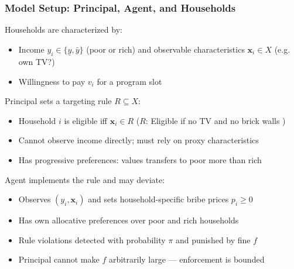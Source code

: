 \documentclass[aspectratio=169]{beamer}
\begin{document}
\begin{frame}
\frametitle{Model Setup: Principal, Agent, and Households}

Households are characterized by:
\begin{itemize}\setlength\itemsep{3pt}
    \item Income $y_i \in \{\underline{y}, \bar{y}\}$ (poor or rich) and observable characteristics $\mathbf{x}_i \in X$ (e.g. own TV?)
    \item Willingness to pay $v_i$ for a program slot
\end{itemize}\medskip

Principal sets a targeting rule $R \subseteq X$:
\begin{itemize}\setlength\itemsep{3pt}
    \item Household $i$ is eligible iff $\mathbf{x}_i \in R$ ($R$: Eligible if no TV and no brick walls  )
    \item Cannot observe income directly; must rely on proxy characteristics
    \item Has progressive preferences: values transfers to poor more than rich
\end{itemize}\medskip

Agent implements the rule and may deviate:
\begin{itemize}\setlength\itemsep{3pt}
    \item Observes $(y_i, \mathbf{x}_i)$ and sets household-specific bribe prices $p_i \geq 0$
    \item Has own allocative preferences over poor and rich households
    \item Rule violations detected with probability $\pi$ and punished by fine $f$
    \item Principal cannot make $f$ arbitrarily large --- enforcement is bounded
\end{itemize}
\end{frame}
\end{document}
